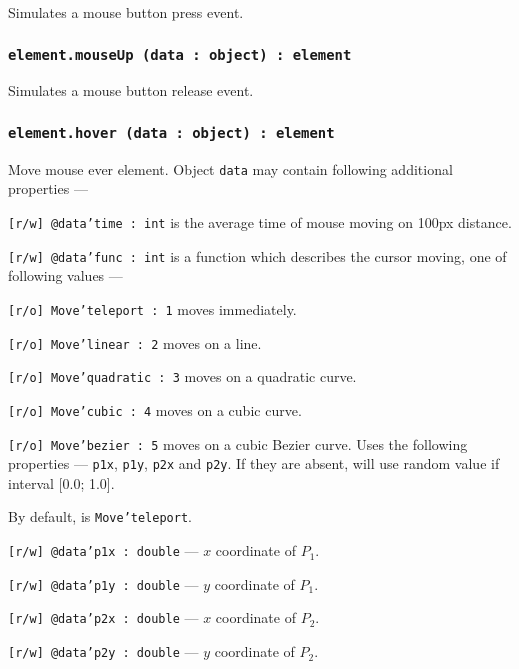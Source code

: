 Simulates a mouse button press event.

\subsubsection{\texttt{element.mouseUp (data : object) : element}}

Simulates a mouse button release event.

\subsubsection{\texttt{element.hover (data : object) : element}}

Move mouse ever element. Object \texttt{data} may contain following additional properties —
\begin{icItems}
	\item \texttt{[r/w] @data'time : int} is the average time of mouse moving on 100px distance.
	\item \texttt{[r/w] @data'func : int} is a function which describes the cursor moving, one of following values —
	\begin{icItems}
		\item \texttt{[r/o] Move'teleport : 1} moves immediately.
		\item \texttt{[r/o] Move'linear : 2} moves on a line.
		\item \texttt{[r/o] Move'quadratic : 3} moves on a quadratic curve.
		\item \texttt{[r/o] Move'cubic : 4} moves on a cubic curve.
		\item \texttt{[r/o] Move'bezier : 5} moves on a cubic Bezier curve. Uses the following properties — \texttt{p1x}, \texttt{p1y}, \texttt{p2x} and \texttt{p2y}. If they are absent, will use random value if interval [0.0; 1.0].
	\end{icItems}
	By default, is \texttt{Move'teleport}.
	\item \texttt{[r/w] @data'p1x : double} — $x$ coordinate of $P_1$.
	\item \texttt{[r/w] @data'p1y : double} — $y$ coordinate of $P_1$.
	\item \texttt{[r/w] @data'p2x : double} — $x$ coordinate of $P_2$.
	\item \texttt{[r/w] @data'p2y : double} — $y$ coordinate of $P_2$.
\end{icItems}

